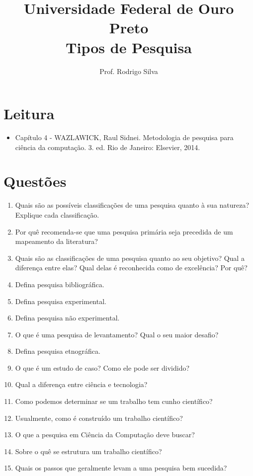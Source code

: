 \documentclass{article}
\title{\vspace{-2 cm}Universidade Federal de Ouro Preto \\ Tipos de Pesquisa}
\author{Prof. Rodrigo Silva}
\date{}
\begin{document}
\maketitle

\section{Leitura}

\begin{itemize}
    \item Capítulo 4 - WAZLAWICK, Raul Sidnei. Metodologia de pesquisa para ciência da computação. 3. ed. Rio de Janeiro: Elsevier, 2014.
\end{itemize}

\section{Questões}

\begin{enumerate}
\item Quais são as possíveis classificações de uma pesquisa quanto à sua natureza? Explique cada classificação.
\item Por quê recomenda-se que uma pesquisa primária seja precedida de um mapeamento da literatura?   
\item Quais são as classificações de uma pesquisa quanto ao seu objetivo? Qual a diferença entre elas? Qual delas é reconhecida como de excelência? Por quê?
\item Defina pesquisa bibliográfica.
\item Defina pesquisa experimental.
\item Defina pesquisa não experimental.
\item O que é uma pesquisa de levantamento? Qual o seu maior desafio?
\item Defina pesquisa etnográfica.
\item O que é um estudo de caso? Como ele pode ser dividido?
\item Qual a diferença entre ciência e tecnologia? 
\item Como podemos determinar se um trabalho tem cunho científico?
\item Usualmente, como é construído um trabalho científico?
\item O que a pesquisa em Ciência da Computação deve buscar?
\item Sobre o quê se estrutura um trabalho científico?
\item Quais os passos que geralmente levam a uma pesquisa bem sucedida? 
\end{enumerate}


%
%
\end{document}

